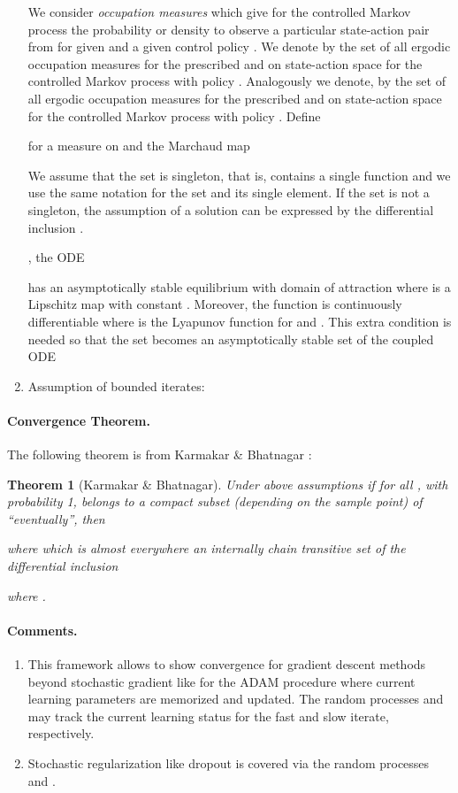 \documentclass{article}
\newtheorem{theorem}{Theorem}
\begin{document}
\begin{enumerate}[label=\textbf{(A\arabic*)}]
We consider {\em occupation measures}
which give for
the controlled Markov process the probability or
density to observe a particular
state-action pair from 
for given  and a given control policy .
We denote by  the set of all ergodic occupation
measures
for the prescribed  and 
on state-action space 
for the controlled Markov process 
with policy .
Analogously we denote, by
 the set of all ergodic occupation measures
for the prescribed  and 
on state-action space 
for the controlled Markov process 
with policy .
Define

for  a measure on  and the Marchaud map

We assume that the set  is singleton, that is,
 contains a single function and we use the same
notation for the set and its single element.
If the set is not a singleton,
the assumption of a solution can be expressed by the differential
inclusion
 \cite{Karmakar:17}.

, the ODE

has an asymptotically stable equilibrium 
with domain of attraction 
where  is a Lipschitz map with constant .
Moreover, the function  is continuously differentiable where  is the Lyapunov function
for  and . This extra condition is needed
so that the set  becomes an asymptotically stable set of the coupled ODE


\item Assumption of bounded iterates:


\end{enumerate}



\paragraph{Convergence Theorem.}
The following theorem is from Karmakar \& Bhatnagar \cite{Karmakar:17}:
\begin{theorem}[Karmakar \& Bhatnagar]
\label{th:karmakar}
Under above assumptions
if for all , with probability 1, 
belongs to a compact subset  (depending
on the sample point) of  ``eventually'', then

where 
which is almost everywhere an internally chain transitive set
of the differential inclusion

where .
\end{theorem}


\paragraph{Comments.}
\begin{enumerate}[label=\textbf{(C\arabic*)}]
\item
This framework allows to show convergence for gradient descent methods
beyond stochastic gradient
like for the ADAM procedure where current learning parameters are
memorized and updated.
The random processes  and  may track the
current learning status for the fast and slow iterate, respectively.
\item
Stochastic regularization like dropout is covered via
the random processes  and .
\end{enumerate}
\end{document}
